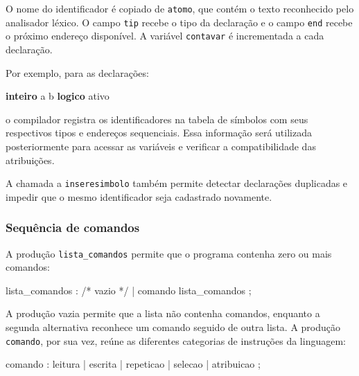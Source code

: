 \documentclass[
  brazilian,
  letterpaper,
]{book}
\newenvironment{Shaded}{\begin{snugshade}}{\end{snugshade}}
\newcommand{\CommentTok}[1]{\textcolor[rgb]{0.37,0.37,0.37}{#1}}
\newcommand{\KeywordTok}[1]{\textcolor[rgb]{0.00,0.23,0.31}{\textbf{#1}}}
\newcommand{\NormalTok}[1]{\textcolor[rgb]{0.00,0.23,0.31}{#1}}
\newcommand{\OperatorTok}[1]{\textcolor[rgb]{0.37,0.37,0.37}{#1}}
\theoremstyle{plain}
\theoremstyle{definition}
\theoremstyle{remark}
\begin{document}
O nome do identificador é copiado de \texttt{atomo}, que contém o texto
reconhecido pelo analisador léxico. O campo \texttt{tip} recebe o tipo
da declaração e o campo \texttt{end} recebe o próximo endereço
disponível. A variável \texttt{contavar} é incrementada a cada
declaração.

Por exemplo, para as declarações:

\begin{Shaded}
\begin{Highlighting}[]
\KeywordTok{inteiro}\NormalTok{ a b}
\KeywordTok{logico}\NormalTok{ ativo}
\end{Highlighting}
\end{Shaded}

o compilador registra os identificadores na tabela de símbolos com seus
respectivos tipos e endereços sequenciais. Essa informação será
utilizada posteriormente para acessar as variáveis e verificar a
compatibilidade das atribuições.

A chamada a \texttt{inseresimbolo} também permite detectar declarações
duplicadas e impedir que o mesmo identificador seja cadastrado
novamente.

\subsubsection{Sequência de comandos}\label{sequuxeancia-de-comandos}

A produção \texttt{lista\_comandos} permite que o programa contenha zero
ou mais comandos:

\begin{Shaded}
\begin{Highlighting}[]
\NormalTok{lista\_comandos}
    \OperatorTok{:} \CommentTok{/* vazio */}
    \OperatorTok{|}\NormalTok{ comando lista\_comandos}
    \OperatorTok{;}
\end{Highlighting}
\end{Shaded}

A produção vazia permite que a lista não contenha comandos, enquanto a
segunda alternativa reconhece um comando seguido de outra lista. A
produção \texttt{comando}, por sua vez, reúne as diferentes categorias
de instruções da linguagem:

\begin{Shaded}
\begin{Highlighting}[]
\NormalTok{comando}
    \OperatorTok{:}\NormalTok{ leitura}
    \OperatorTok{|}\NormalTok{ escrita}
    \OperatorTok{|}\NormalTok{ repeticao}
    \OperatorTok{|}\NormalTok{ selecao}
    \OperatorTok{|}\NormalTok{ atribuicao}
    \OperatorTok{;}
\end{Highlighting}
\end{Shaded}
\end{document}
